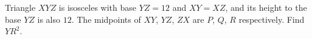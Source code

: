 Triangle $XYZ$ is isosceles with base $YZ=12$ and $XY=XZ$, and its height to the base $YZ$ is also $12$. The midpoints of $XY$, $YZ$, $ZX$ are $P$, $Q$, $R$ respectively. Find $YR^2$.
